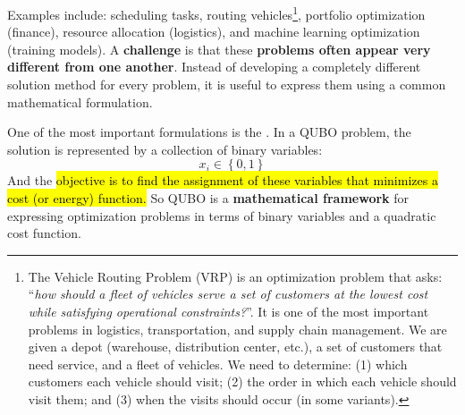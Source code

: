 \highspace
Examples include: scheduling tasks, routing vehicles\footnote{%
    The Vehicle Routing Problem (VRP) is an optimization problem that asks: ``\emph{how should a fleet of vehicles serve a set of customers at the lowest cost while satisfying operational constraints?}''. It is one of the most important problems in logistics, transportation, and supply chain management. We are given a depot (warehouse, distribution center, etc.), a set of customers that need service, and a fleet of vehicles. We need to determine: (1) which customers each vehicle should visit; (2) the order in which each vehicle should visit them; and (3) when the visits should occur (in some variants).  
}, portfolio optimization (finance), resource allocation (logistics), and machine learning optimization (training models). A \textbf{challenge} is that these \textbf{problems often appear very different from one another}. Instead of developing a completely different solution method for every problem, it is useful to express them using a common mathematical formulation. 

\highspace
One of the most important formulations is the . In a QUBO problem, the solution is represented by a collection of binary variables:
\begin{equation*}
    x_{i} \in \left\{0, 1\right\}
\end{equation*}
And the \hl{objective is to find the assignment of these variables that minimizes a cost (or energy) function.} So QUBO is a \textbf{mathematical framework} for expressing optimization problems in terms of binary variables and a quadratic cost function.

